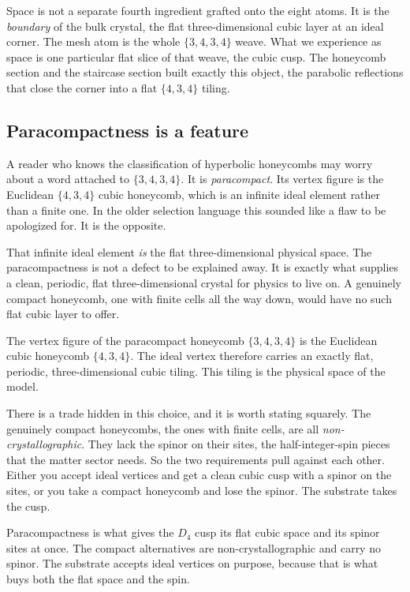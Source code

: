 Space is not a separate fourth ingredient grafted onto the eight atoms. It is the \emph{boundary} of the bulk crystal, the flat three-dimensional cubic layer at an ideal corner. The mesh atom is the whole $\{3,4,3,4\}$ weave. What we experience as space is one particular flat slice of that weave, the cubic cusp. The honeycomb section and the staircase section built exactly this object, the parabolic reflections that close the corner into a flat $\{4,3,4\}$ tiling.

\subsection{Paracompactness is a feature}

A reader who knows the classification of hyperbolic honeycombs may worry about a word attached to $\{3,4,3,4\}$. It is \emph{paracompact}. Its vertex figure is the Euclidean $\{4,3,4\}$ cubic honeycomb, which is an infinite ideal element rather than a finite one. In the older selection language this sounded like a flaw to be apologized for. It is the opposite.

That infinite ideal element \emph{is} the flat three-dimensional physical space. The paracompactness is not a defect to be explained away. It is exactly what supplies a clean, periodic, flat three-dimensional crystal for physics to live on. A genuinely compact honeycomb, one with finite cells all the way down, would have no such flat cubic layer to offer.

\begin{theorem}
The vertex figure of the paracompact honeycomb $\{3,4,3,4\}$ is the Euclidean cubic honeycomb $\{4,3,4\}$. The ideal vertex therefore carries an exactly flat, periodic, three-dimensional cubic tiling. This tiling is the physical space of the model.
\end{theorem}

There is a trade hidden in this choice, and it is worth stating squarely. The genuinely compact honeycombs, the ones with finite cells, are all \emph{non-crystallographic}. They lack the spinor on their sites, the half-integer-spin pieces that the matter sector needs. So the two requirements pull against each other. Either you accept ideal vertices and get a clean cubic cusp with a spinor on the sites, or you take a compact honeycomb and lose the spinor. The substrate takes the cusp.

\begin{result}
Paracompactness is what gives the $D_4$ cusp its flat cubic space and its spinor sites at once. The compact alternatives are non-crystallographic and carry no spinor. The substrate accepts ideal vertices on purpose, because that is what buys both the flat space and the spin.
\end{result}

